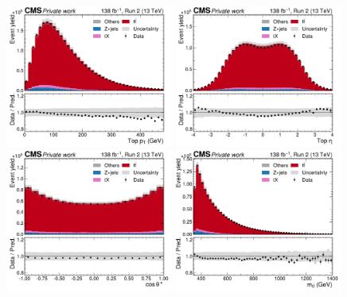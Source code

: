 \begin{figure}[!hp]
    \centering
    \includegraphics[width=0.49\textwidth]{figures/ah/controlplots/Reco/ll/top_pt_Reco_ll.pdf}
    \hfill
    \includegraphics[width=0.49\textwidth]{figures/ah/controlplots/Reco/ll/top_eta_Reco_ll.pdf}
    \includegraphics[width=0.49\textwidth]{figures/ah/controlplots/Reco/ll/costhetastar_Reco_ll.pdf}
    \hfill
    \includegraphics[width=0.49\textwidth]{figures/ah/controlplots/Reco/ll/mtt_Reco_ll.pdf}

\end{figure}
